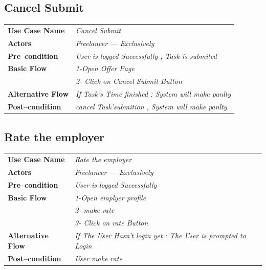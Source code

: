 \documentclass{article}
\begin{document}
				\subsection{ Cancel Submit	 }
    \begin{tabular}{ l | l }
    \toprule
      \rowcolor{LightCyan}
      \textbf{Use Case Name}    & \textit{  Cancel Submit	 }\\
      \textbf{Actors}           & \textit{ Freelancer --- Exclusively}\\
      \rowcolor{LightCyan}
      \textbf{Pre--condition}   & \textit {User is logged Successfully , Task is submited  } \\
      \rowcolor{LightCyan}
      \textbf{Basic Flow}       & \textit{ 1-Open Offer  Page }\\
                                & \textit{2- Click on  Cancel Submit  Button}\\
								
								
	  \rowcolor{LightCyan}
      \textbf{	Alternative Flow}     
								& \textit{		If Task's Time finished : 
									System will make panlty  }\\
	

      \rowcolor{LightCyan}
      \textbf{Post--condition}  & \textit{ cancel Task'submition  , System will make panlty  }\\
    \toprule
    \end{tabular}
	
	
	
					\subsection{ 	 Rate the employer }
    \begin{tabular}{ l | l }
    \toprule
      \rowcolor{LightCyan}
      \textbf{Use Case Name}    & \textit{ 	 Rate the employer	 }\\
      \textbf{Actors}           & \textit{ Freelancer --- Exclusively}\\
      \rowcolor{LightCyan}
      \textbf{Pre--condition}   & \textit {User is logged Successfully  } \\
      \rowcolor{LightCyan}
      \textbf{Basic Flow}       & \textit{1-Open emplyer profile }\\
                                & \textit{2- make rate}\\
								 & \textit{3- Click on  rate  Button}\\
								
	  \rowcolor{LightCyan}
      \textbf{	Alternative Flow}     
								& \textit{		If The User Hasn't login yet :
									The User is prompted to Login}\\
									
	

      \rowcolor{LightCyan}
      \textbf{Post--condition}  & \textit{User make rate  }\\
    \toprule
    \end{tabular}
\end{document}
